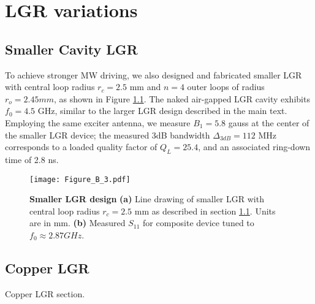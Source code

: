 \chapter{LGR variations} %

\section{Smaller Cavity LGR} \label{smallLGR}

To achieve stronger MW driving, we also designed and fabricated
smaller LGR with central loop radius $r_c = 2.5$ mm and $n = 4$ outer loops of radius $r_o = 2.45mm$, as shown in Figure \ref{smallLGRfigure}. The naked air-gapped LGR cavity exhibits $f_0 = 4.5$ GHz, similar to the larger LGR design described in the main text. Employing the same exciter antenna, we measure $B_1 = 5.8$ gauss at the center of the smaller LGR device; the measured 3dB bandwidth $\Delta_{3dB} = 112$ MHz corresponds to a loaded quality factor of $Q_L = 25.4$, and an associated ring-down time of 2.8 ns.

\begin{figure}[t!]
\centering
\texttt{[image: Figure\_B\_3.pdf]}  
\caption{\textbf{Smaller LGR design} \textbf{(a)} Line drawing of smaller LGR with central loop radius $r_c = 2.5$ mm as described in section \ref{smallLGR}. Units are in mm. \textbf{(b)} Measured $S_{11}$ for composite device tuned to $f_0 \approx 2.87 GHz$.}
\label{smallLGRfigure}
\end{figure}    


\section{Copper LGR}

Copper LGR section.

\clearpage
\newpage
